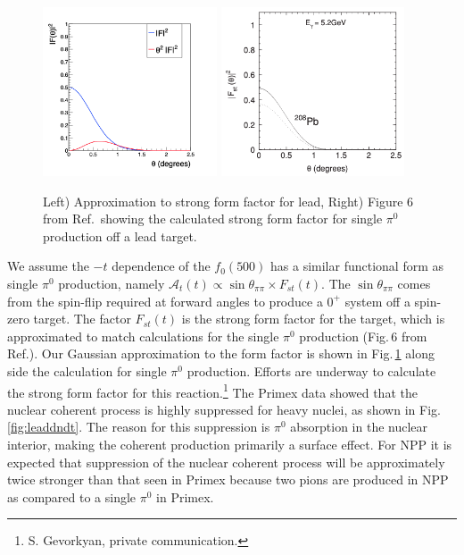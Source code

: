  \begin{figure}[tbh]
\begin{center}
\includegraphics[height=5cm,clip=true]{figures/fit_Primakoff_sigma_c1.png}
\includegraphics[height=5cm,clip=true]{figures/PRC80_2009_Fig6.png}
\caption{ Left) Approximation to strong form factor for lead, Right) Figure 6 from Ref.\,\cite{Gevorkyan:2009ge} showing the calculated strong form factor for single $\pi^0$ production off a lead target.
\label{fig:strongFF}}
\end{center}
\end{figure}

We assume the $-t$ dependence of the $f_0(500)$ has a similar functional form as single $\pi^0$ production, namely $\mathcal{A}_t(t) \propto \sin{\theta_{\pi\pi}} \times F_{st}(t)$.  The $\sin{\theta_{\pi\pi}}$ 
comes from the spin-flip required at forward angles to produce a $0^+$ system off a spin-zero target. The factor $F_{st}(t)$ is the strong form factor for the target, which is approximated to
match calculations for the single $\pi^0$ production (Fig.\,6 from Ref.\cite{Gevorkyan:2009ge}). Our Gaussian approximation to the form factor is shown in Fig.\,\ref{fig:strongFF} along side the calculation for single 
$\pi^0$ production. Efforts are underway to calculate the strong form factor for this reaction.\footnote{S. Gevorkyan, private communication.}
The Primex data showed that the nuclear coherent process is highly
suppressed for heavy nuclei, as shown in Fig.\ref{fig:leaddndt}.  The reason for this suppression is
$\pi^0$ absorption in the nuclear interior, making the coherent
production primarily a surface effect.  For NPP it is expected that suppression of the nuclear  
coherent process will be approximately twice stronger than that seen in Primex because two pions
are produced in NPP as compared to a single $\pi^0$ in Primex. 

